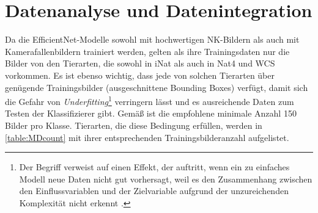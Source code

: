 \section{Datenanalyse und Datenintegration} \label{sec:dataintegration}

Da die EfficientNet-Modelle sowohl mit hochwertigen NK-Bildern als auch mit Kamerafallenbildern trainiert werden, gelten als ihre Trainingsdaten nur die Bilder von den Tierarten, die sowohl in iNat als auch in Nat4 und WCS vorkommen. Es ist ebenso wichtig, dass jede von solchen Tierarten über genügende Trainingsbilder (ausgeschnittene Bounding Boxes) verfügt, damit sich die Gefahr von \emph{Underfitting}\footnote{Der Begriff verweist auf einen Effekt, der auftritt, wenn ein zu einfaches Modell neue Daten nicht gut vorhersagt, weil es den Zusammenhang zwischen den Einflussvariablen und der Zielvariable aufgrund der unzureichenden Komplexität nicht erkennt \cite{Novustat}.} verringern lässt und es ausreichende Daten zum Testen der Klassifizierer gibt. Gemäß \cite[13]{SHAHINFAR2020101085} ist die empfohlene minimale Anzahl 150 Bilder pro Klasse. Tierarten, die diese Bedingung erfüllen, werden in \autoref{table:MDcount} mit ihrer entsprechenden Trainingsbilderanzahl aufgelistet.


